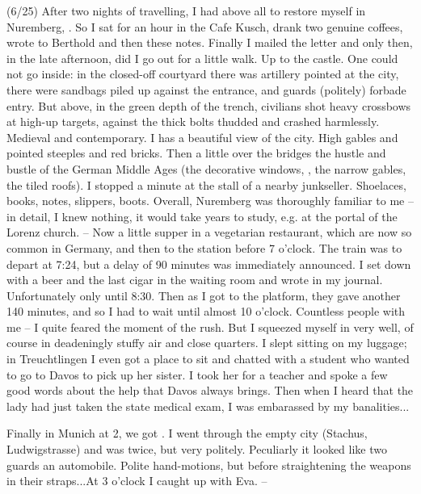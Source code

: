 (6/25) After two nights of travelling, I had above all to restore myself in Nuremberg, . So I sat for an hour in the Cafe Kusch, drank two genuine coffees, wrote to Berthold and then these notes. Finally I mailed the letter and only then, in the late afternoon, did I go out for a little walk. Up to the castle. One could not go inside: in the closed-off courtyard there was artillery pointed at the city, there were sandbags piled up against the entrance, and guards (politely) forbade entry. But above, in the green depth of the trench, civilians shot heavy crossbows at high-up targets, against  the thick bolts thudded and crashed harmlessly. Medieval and contemporary.  I has a beautiful view of the city. High gables and pointed steeples and red bricks. Then a little over the bridges the hustle and bustle of the German Middle Ages  (the decorative windows, , the narrow gables, the tiled roofs). I stopped a minute at the stall of a nearby junkseller. Shoelaces, books, notes, slippers, boots. Overall, Nuremberg was thoroughly familiar to me -- in detail, I knew nothing, it would take years to study, e.g. at the portal of the Lorenz church. -- Now a little supper in a vegetarian restaurant, which are now so common in Germany, and then to the station before 7 o'clock. The train was to depart at 7:24, but a delay of 90 minutes was immediately announced. I set down with a beer and the last cigar in the waiting room and wrote in my journal. Unfortunately only until 8:30. Then as I got to the platform, they gave another 140 minutes, and so I had to wait until almost 10 o'clock. Countless people with me -- I quite feared the moment of the rush. But I squeezed myself in very well, of course in deadeningly stuffy air and close quarters. I slept sitting on my luggage; in Treuchtlingen I even got a place to sit and chatted with a student who wanted to go to Davos to pick up her sister. I took her for a teacher and spoke a few good words about the help that Davos always brings. Then when I heard that the lady had just taken the state medical exam, I was embarassed by my banalities...

Finally in Munich at 2, we got . I went through the empty city (Stachus, Ludwigstrasse) and was  twice, but very politely. Peculiarly it looked like two guards  an automobile. Polite hand-motions, but before straightening the weapons in their straps...At 3 o'clock I caught up with Eva. --

\missing


